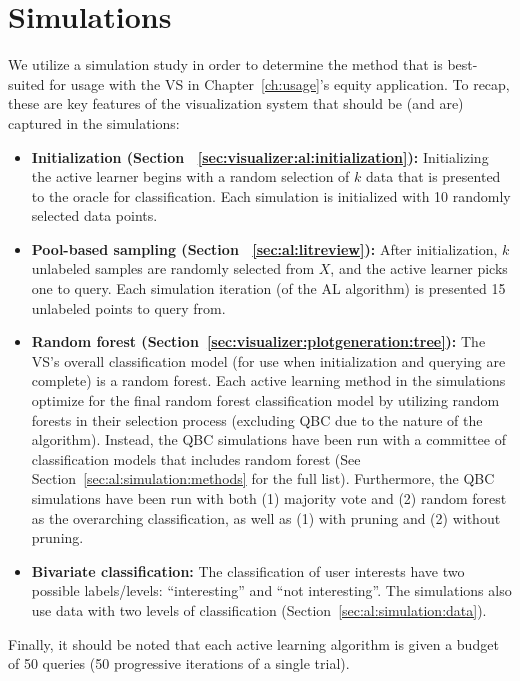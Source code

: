 \section{Simulations}
\label{sec:al:simulations}

We utilize a simulation study in order to determine the method that is 
best-suited for usage with the VS in Chapter~\ref{ch:usage}'s equity 
application. To recap, these are key features of the visualization system that 
should be (and are) captured in the simulations:

\tablespacing
\begin{itemize}
	\item \textbf{Initialization (Section 
	~\ref{sec:visualizer:al:initialization}):} 
	Initializing the active learner begins with a random selection of $k$ data 
	that is presented to the oracle for classification. Each simulation is 
	initialized with 10 randomly selected data points.
	\item \textbf{Pool-based sampling (Section ~\ref{sec:al:litreview}):} After 
	initialization, $k$ unlabeled samples are randomly selected from $X$, and 
	the active learner picks one to query. Each simulation iteration (of the AL 
	algorithm) is presented 15 unlabeled points to query from.
	\item \textbf{Random forest 
	(Section~\ref{sec:visualizer:plotgeneration:tree}):} The VS's overall 
	classification model (for use when initialization and querying are 
	complete) is a random forest. Each active learning method in the 
	simulations optimize for the 
	final random forest classification model by utilizing random forests in 
	their selection process (excluding QBC due to the nature of the 
	algorithm). Instead, the QBC simulations have been run with a committee of 
	classification models that includes random forest (See 
	Section~\ref{sec:al:simulation:methods} for the full list). Furthermore, 
	the QBC simulations have been run with both (1) majority vote and (2) 
	random forest as the overarching classification, as well as (1) with 
	pruning and (2) without pruning.
	\item \textbf{Bivariate classification:} The classification of user 
	interests have two possible labels/levels: ``interesting'' and ``not 
	interesting''. The simulations also use data with two levels of 
	classification (Section~\ref{sec:al:simulation:data}).
\end{itemize}
\bodyspacing

\noindent Finally, it should be noted that each active learning algorithm is 
given a budget of 50 queries (50 progressive iterations of a single trial).

